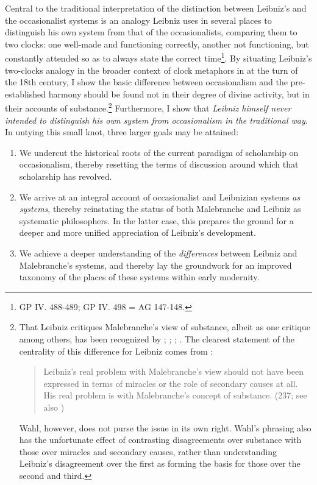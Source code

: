 \documentclass{article}
\begin{document}
Central to the traditional interpretation of the distinction between Leibniz's and the occasionalist systems is an analogy Leibniz uses in several places to distinguish his own system from that of the occasionalists, comparing them to two clocks: one well-made and functioning correctly, another not functioning, but constantly attended so as to always state the correct time\footnote{GP IV. 488-489; GP IV. 498 = AG 147-148.}. By situating Leibniz's two-clocks analogy in the broader context of clock metaphors in at the turn of the 18th century, I show the basic difference between occasionalism and the pre-established harmony should be found not in their degree of divine activity, but in their accounts of substance.\footnote{That Leibniz critiques Malebranche's view of substance, albeit as one critique among others, has been recognized by \autocite[40]{Rutherford1993}; \autocite[299-301]{Garber1995}; \autocite[193-194]{Garber2009}; \autocite[280-281, fn. 16]{Brown2000}. The clearest statement of the centrality of this difference for Leibniz comes from \autocite{Wahl2011}:
  \begin{quote}
  	Leibniz's real problem with Malebranche's view should not have been expressed in terms of miracles or the role of secondary causes at all. His real problem is with Malebranche's concept of substance. (237; see also \autocite{Whipple2010})
  \end{quote}

  Wahl, however, does not purse the issue in its own right. Wahl's phrasing also has the unfortunate effect of contrasting disagreements over substance with those over miracles and secondary causes, rather than understanding Leibniz's disagreement over the first as forming the basis for those over the second and third.} Furthermore, I show that \emph{Leibniz himself never intended to distinguish his own system from occasionalism in the traditional way}. In untying this small knot, three larger goals may be attained:

\begin{enumerate}
\item We undercut the historical roots of the current paradigm of scholarship on occasionalism, thereby resetting the terms of discussion around which that scholarship has revolved.
\item We arrive at an integral account of occasionalist and Leibnizian systems \emph{as systems}, thereby reinstating the status of both Malebranche and Leibniz as systematic philosophers. In the latter case, this prepares the ground for a deeper and more unified appreciation of Leibniz's development.
\item We achieve a deeper understanding of the \emph{differences} between Leibniz and Malebranche's systems, and thereby lay the groundwork for an improved taxonomy of the places of these systems within early modernity.
\end{enumerate}
\end{document}
